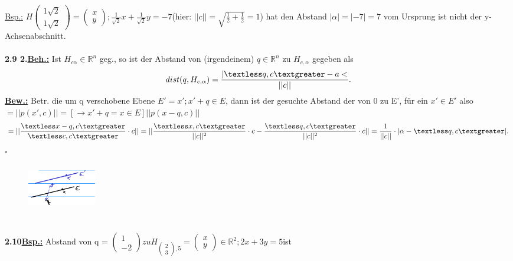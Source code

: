 \documentclass[]{scrartcl}
\begin{document}
\underline{Bsp.:} 
$H\begin{pmatrix}
	1\sqrt{2}\\
	1\sqrt{2}
\end{pmatrix}={\begin{pmatrix}
	x\\y
\end{pmatrix}; \frac{1}{\sqrt{2}}x+\frac{1}{\sqrt{2}}y=-7}$(hier: 
$||c||=\sqrt{\frac{1}{2}+\frac{1}{2}}=1$) hat den Abstand $|\alpha| = |-7|=7$ 
vom Ursprung ist nicht der y-Achsenabschnitt.\\
\\
\textbf{2.9 2.\underline{Beh.:}} Ist $H_{c\alpha}\in \mathbb{R}^n$ geg., so ist 
der 
Abstand von (irgendeinem) $ q \in \mathbb{R}^n$ zu $H_{c,\alpha}$ gegeben als\\
\begin{equation}
	dist(q,H_{c,\alpha})= \frac{|\textless q,c\textgreater-a <}{||c||}.
\end{equation}
\textbf{\underline{Bew.:}} Betr. die um q verschobene Ebene $E'= {x'; x'+q\in 
E}$, dann ist der gesuchte Abstand der von 0 zu E', für ein $x'\in E'$ also 
$=||p(x',c)|| = [\rightarrow x'+q=x\in E] ||p(x-q,c)||$\\
\begin{equation}
	=||\frac{\textless x-q,c\textgreater}{\textless c,c \textgreater}\cdot c||=
	||\frac{\textless x,c \textgreater}{||c||^2}\cdot c -\frac{\textless q,c 
	\textgreater}{||c||^2}\cdot c||=
	\frac{1}{||c||}\cdot|\alpha - \textless q,c \textgreater|.
\end{equation}
\hfill$\square$\\
\begin{figure}[h]  
	\includegraphics[width=3cm,height=2cm]{bild 2.9}
\end{figure}\\
\textbf{2.10\underline{Bsp.:}} Abstand von q = $\begin{pmatrix}
	1\\-2
\end{pmatrix} zu H_{\begin{pmatrix}
	2\\3
\end{pmatrix},5} ={\begin{pmatrix}
	x\\y
\end{pmatrix} \in \mathbb{R}^2;2x+3y=5}$ist\\
\end{document}
